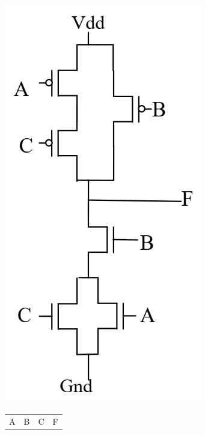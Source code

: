 \documentclass[12pt,letterpaper,titlepage]{article}
\begin{document}
\begin{raggedright}
\begin{center}
\begin{paracol}{3}
\includegraphics[width=\textwidth, height=15\baselineskip, keepaspectratio=true]{hw1q5}
\switchcolumn
{\renewcommand{\arraystretch}{0.9}
\begin{tabular}{|ccc|c|}
\hline
   A & B & C & F 

\end{tabular}}
\end{paracol}
\end{center}
\end{raggedright}
\end{document}
